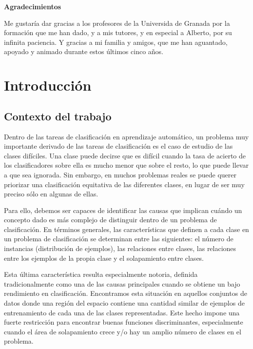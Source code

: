 \documentclass[a4paper,12pt]{report}
\theoremstyle{definition}
\begin{document}
\begin{titlepage}
  {\huge \bfseries Agradecimientos}
  \vspace{1cm}

  Me gustaría dar gracias a los profesores de la Universida de Granada por la formación que me han dado, y a mis tutores, y en especial a Alberto, por su infinita paciencia. Y gracias a mi familia y amigos, que me han aguantado, apoyado y animado durante estos últimos cinco años.
\end{titlepage}

\tableofcontents
\pagebreak

\chapter{Introducción}
\label{chp:intro}
\section{Contexto del trabajo}
Dentro de las tareas de clasificación en aprendizaje automático, un problema muy importante derivado de las tareas de clasificación es el caso de estudio de las clases difíciles. Una clase puede decirse que es difícil cuando la tasa de acierto de los clasificadores sobre ella es mucho menor que sobre el resto, lo que puede llevar a que sea ignorada. Sin embargo, en muchos problemas reales se puede querer priorizar una clasificación equitativa de las diferentes clases, en lugar de ser muy preciso sólo en algunas de ellas.

Para ello, debemos ser capaces de identificar las causas que implican cuándo un concepto dado es más complejo de distinguir dentro de un problema de clasificación. En términos generales, las características que definen a cada clase en un problema de clasificación se determinan entre las siguientes: el número de instancias (distribución de ejemplos), las relaciones entre clases, las relaciones entre los ejemplos de la propia clase y el solapamiento entre clases.

Esta última característica resulta especialmente notoria, definida tradicionalmente como una de las causas principales cuando se obtiene un bajo rendimiento en clasificación. Encontramos esta situación en aquellos conjuntos de datos donde una región del espacio contiene una cantidad similar de ejemplos de entrenamiento de cada una de las clases representadas. Este hecho impone una fuerte restricción para encontrar buenas funciones discriminantes, especialmente cuando el área de solapamiento crece y/o hay un amplio número de clases en el problema.
\end{document}
